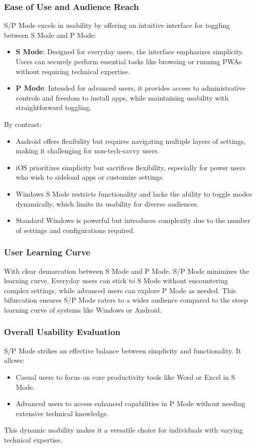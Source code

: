 \subsubsection{Ease of Use and Audience Reach}
S/P Mode excels in usability by offering an intuitive interface for toggling between S Mode and P Mode:
\begin{itemize}
    \item \textbf{S Mode}: Designed for everyday users, the interface emphasizes simplicity. Users can securely perform essential tasks like browsing or running PWAs without requiring technical expertise.
    \item \textbf{P Mode}: Intended for advanced users, it provides access to administrative controls and freedom to install apps, while maintaining usability with straightforward toggling.
\end{itemize}
By contrast:
\begin{itemize}
    \item Android offers flexibility but requires navigating multiple layers of settings, making it challenging for non-tech-savvy users.
    \item iOS prioritizes simplicity but sacrifices flexibility, especially for power users who wish to sideload apps or customize settings.
    \item Windows S Mode restricts functionality and lacks the ability to toggle modes dynamically, which limits its usability for diverse audiences.
    \item Standard Windows is powerful but introduces complexity due to the number of settings and configurations required.
\end{itemize}

\subsubsection{User Learning Curve}
With clear demarcation between S Mode and P Mode, S/P Mode minimizes the learning curve. Everyday users can stick to S Mode without encountering complex settings, while advanced users can explore P Mode as needed. This bifurcation ensures S/P Mode caters to a wider audience compared to the steep learning curve of systems like Windows or Android.

\subsubsection{Overall Usability Evaluation}
S/P Mode strikes an effective balance between simplicity and functionality. It allows:
\begin{itemize}
    \item Casual users to focus on core productivity tools like Word or Excel in S Mode.
    \item Advanced users to access enhanced capabilities in P Mode without needing extensive technical knowledge.
\end{itemize}
This dynamic usability makes it a versatile choice for individuals with varying technical expertise.


